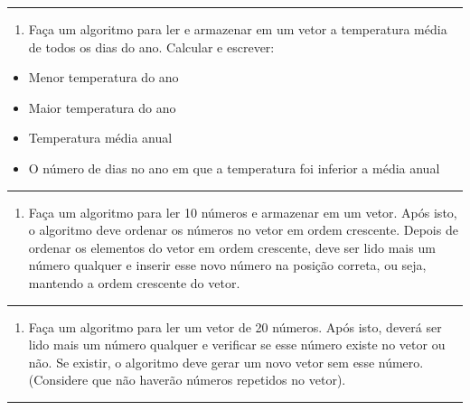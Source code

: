 \documentclass[12pt,a4paper]{article}
\providecommand{\tightlist}{%
      \setlength{\itemsep}{0pt}\setlength{\parskip}{0pt}}
\begin{document}
    \begin{center}\rule{0.5\linewidth}{0.5pt}\end{center}

\begin{enumerate}
\def\labelenumi{\arabic{enumi}.}
\setcounter{enumi}{8}
\tightlist
\item
  Faça um algoritmo para ler e armazenar em um vetor a temperatura média
  de todos os dias do ano. Calcular e escrever:
\end{enumerate}

\begin{itemize}
\tightlist
\item
  Menor temperatura do ano
\item
  Maior temperatura do ano
\item
  Temperatura média anual
\item
  O número de dias no ano em que a temperatura foi inferior a média
  anual
\end{itemize}

    \begin{center}\rule{0.5\linewidth}{0.5pt}\end{center}

\begin{enumerate}
\def\labelenumi{\arabic{enumi}.}
\setcounter{enumi}{9}
\tightlist
\item
  Faça um algoritmo para ler 10 números e armazenar em um vetor. Após
  isto, o algoritmo deve ordenar os números no vetor em ordem crescente.
  Depois de ordenar os elementos do vetor em ordem crescente, deve ser
  lido mais um número qualquer e inserir esse novo número na posição
  correta, ou seja, mantendo a ordem crescente do vetor.
\end{enumerate}

    \begin{center}\rule{0.5\linewidth}{0.5pt}\end{center}

\begin{enumerate}
\def\labelenumi{\arabic{enumi}.}
\setcounter{enumi}{10}
\tightlist
\item
  Faça um algoritmo para ler um vetor de 20 números. Após isto, deverá
  ser lido mais um número qualquer e verificar se esse número existe no
  vetor ou não. Se existir, o algoritmo deve gerar um novo vetor sem
  esse número. (Considere que não haverão números repetidos no vetor).
\end{enumerate}

    \begin{center}\rule{0.5\linewidth}{0.5pt}\end{center}
\end{document}
